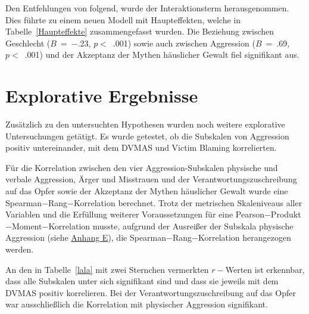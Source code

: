 
Den Entfehlungen von \textcite{Moderation_SPSS} folgend, wurde der Interaktionsterm herausgenommen. Dies führte zu einem neuen Modell mit Haupteffekten, welche in Tabelle~\ref{Haupteffekte} zusammengefasst wurden. Die Beziehung zwischen Geschlecht ($B$~=~$-$.23, $p<$~.001) sowie auch zwischen Aggression ($B$~=~.69, $p<$~.001) und der Akzeptanz der Mythen häuslicher Gewalt fiel signifikant aus. 


\section{Explorative Ergebnisse}    \label{sec_4.4}
Zusätzlich zu den untersuchten Hypothesen wurden noch weitere explorative Untersuchungen getätigt. Es wurde getestet, ob die Subskalen von Aggression positiv untereinander, mit dem DVMAS und Victim Blaming korrelierten. 


Für die Korrelation zwischen den vier Aggression-Subskalen physische und verbale Aggression, Ärger und Misstrauen und der Verantwortungszuschreibung auf das Opfer sowie der Akzeptanz der Mythen häuslicher Gewalt wurde eine Spearman$-$Rang$-$Korrelation berechnet. Trotz der metrischen Skaleniveaus aller Variablen und die Erfüllung weiterer Voraussetzungen für eine Pearson$-$Produkt$-$Moment$-$Korrelation musste, aufgrund der Ausreißer der Subskala physische Aggression (siehe \hyperref[Boxplot_phAggro]{Anhang E}), die Spearman$-$Rang$-$Korrelation herangezogen werden.

An den in Tabelle~\ref{lala} mit zwei Sternchen vermerkten $r-$Werten ist erkennbar, dass alle Subskalen unter sich signifikant sind und dass sie jeweils mit dem DVMAS positiv korrelieren. Bei der Verantwortungszuschreibung auf das Opfer war ausschließlich die Korrelation mit physischer Aggression signifikant.


